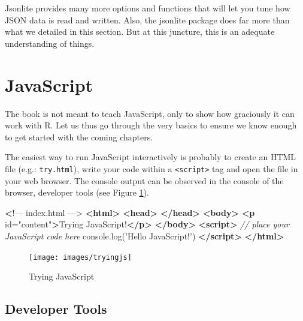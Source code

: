 \documentclass[10pt,]{krantz}
\makeatletter
\newenvironment{Shaded}{\begin{snugshade}}{\end{snugshade}}
\newcommand{\AttributeTok}[1]{\textcolor[rgb]{0.61,0.61,0.61}{#1}}
\newcommand{\CommentTok}[1]{\textcolor[rgb]{0.37,0.37,0.37}{\textit{#1}}}
\newcommand{\ErrorTok}[1]{\textcolor[rgb]{0.14,0.14,0.14}{\textbf{#1}}}
\newcommand{\KeywordTok}[1]{\textcolor[rgb]{0.27,0.27,0.27}{\textbf{#1}}}
\newcommand{\NormalTok}[1]{#1}
\newcommand{\OtherTok}[1]{\textcolor[rgb]{0.37,0.37,0.37}{#1}}
\newcommand{\StringTok}[1]{\textcolor[rgb]{0.5,0.5,0.5}{#1}}
\newcommand{\VariableTok}[1]{\textcolor[rgb]{0,0,0}{#1}}
\newenvironment{kframe}{%
\medskip{}
\setlength{\fboxsep}{.8em}
 \def\at@end@of@kframe{}%
 \ifinner\ifhmode%
  \def\at@end@of@kframe{\end{minipage}}%
  \begin{minipage}{\columnwidth}%
 \fi\fi%
 \def\FrameCommand##1{\hskip\@totalleftmargin \hskip-\fboxsep
 \colorbox{shadecolor}{##1}\hskip-\fboxsep
     \hskip-\linewidth \hskip-\@totalleftmargin \hskip\columnwidth}%
 \MakeFramed {\advance\hsize-\width
   \@totalleftmargin\z@ \linewidth\hsize
   \@setminipage}}%
 {\par\unskip\endMakeFramed%
 \at@end@of@kframe}
\renewenvironment{Shaded}{\begin{kframe}}{\end{kframe}}
\makeatother
\begin{document}
Jsonlite provides many more options and functions that will let you tune how JSON data is read and written. Also, the jsonlite package does far more than what we detailed in this section. But at this juncture, this is an adequate understanding of things.

\hypertarget{basics-javascript}{%
\section{JavaScript}\label{basics-javascript}}

The book is not meant to teach JavaScript, only to show how graciously it can work with R. Let us thus go through the very basics to ensure we know enough to get started with the coming chapters.

The easiest way to run JavaScript interactively is probably to create an HTML file (e.g.: \texttt{try.html}), write your code within a \texttt{\textless{}script\textgreater{}} tag and open the file in your web browser. The console output can be observed in the console of the browser, developer tools (see Figure \ref{fig:trying-js}).

\begin{Shaded}
\begin{Highlighting}[]
\ErrorTok{<}\NormalTok{!–– index.html ––>}
\KeywordTok{<html>}
  \KeywordTok{<head>}
  \KeywordTok{</head>}
  \KeywordTok{<body>}
    \KeywordTok{<p}\OtherTok{ id=}\StringTok{"content"}\KeywordTok{>}\NormalTok{Trying JavaScript!}\KeywordTok{</p>}
  \KeywordTok{</body>}
  \KeywordTok{<script>}
    \CommentTok{// place your JavaScript code here}
    \VariableTok{console}\NormalTok{.}\AttributeTok{log}\NormalTok{(}\StringTok{'Hello JavaScript!'}\NormalTok{)}
  \KeywordTok{</script>}
\KeywordTok{</html>}
\end{Highlighting}
\end{Shaded}

\begin{figure}[H]

{\centering \texttt{[image: images/tryingjs]} 

}

\caption{Trying JavaScript}\label{fig:trying-js}
\end{figure}

\hypertarget{basics-chrome-devtools}{%
\subsection{Developer Tools}\label{basics-chrome-devtools}}
\end{document}
